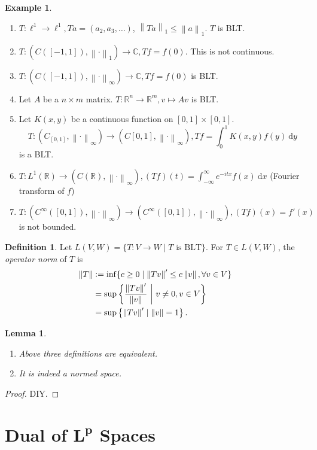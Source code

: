\documentclass{report}
\newcommand{\R}{\mathbb{R}}
\newcommand{\C}{\mathbb{C}}
\newcommand{\df}{\ \mathrm{d}}
\newcommand{\norm}[1]{\left\| #1 \right\|}
\newcommand{\defeq}{\vcentcolon=}
\newtheorem{lemma}[theorem]{Lemma}
\theoremstyle{definition}
\newtheorem{definition}[theorem]{Definition}
\newtheorem{example}[theorem]{Example}
\theoremstyle{remark}
\newcommand*\ttlmath[2]{\texorpdfstring{$\boldsymbol{#1}$}{#2}}
\begin{document}
\begin{example}
	\begin{enumerate}
		\item $T: \ell^1 \to \ell^1, Ta = (a_2, a_3, \ldots)$, $\norm{Ta}_1 \leq \norm{a}_1$. $T$ is BLT.
		\item $T: (C([-1, 1]), \norm{\cdot}_1) \to \C, Tf=f(0)$. This is not continuous.
		\item $T: (C([-1, 1]), \norm{\cdot}_\infty) \to \C, Tf=f(0)$ is BLT.
		\item Let $A$ be a $n \times m$ matrix. $T: \R^n \to \R^m, v \mapsto Av$ is BLT.
		\item Let $K(x, y)$ be a continuous function on $[0, 1] \times [0, 1]$. \[T: (C_[0, 1], \norm{\cdot}_\infty) \to (C[0, 1], \norm{\cdot}_\infty), Tf = \int_0^1 K(x, y)f(y) \df y\] is a BLT.
		\item $\displaystyle T: L^1(\R) \to (C(\R), \norm{\cdot}_\infty), (Tf)(t) = \int_{-\infty}^\infty e^{-itx}f(x) \df x$ (Fourier transform of $f$)
		\item $T: (C^\infty([0, 1]), \norm{\cdot}_\infty) \to (C^\infty([0, 1]), \norm{\cdot}_\infty), (Tf)(x) = f'(x)$ is not bounded.
	\end{enumerate}
\end{example}

\begin{definition}
	Let $L(V, W) = \{T: V \to W \mid T \text{ is BLT}\}$. For $T \in L(V, W)$, the \emph{operator norm} of $T$ is
	\begin{align*}
		\norm{T} & \defeq \inf\{c \geq 0 \mid \norm{Tv}' \leq c\norm{v}, \forall v \in V\} \\
		& = \sup\left\{\frac{\norm{Tv}'}{\norm{v}}\ \biggr\rvert\ v \neq 0, v \in V\right\} \\
		& = \sup\left\{\norm{Tv}' \mid \norm{v} = 1\right\}.
	\end{align*}
\end{definition}
\begin{lemma}
	\begin{enumerate}
		\item Above three definitions are equivalent.
		\item It is indeed a normed space.
	\end{enumerate}
\end{lemma}
\begin{proof}
	DIY.
\end{proof}

\section{Dual of \ttlmath{L^p}{Lp} Spaces}
\end{document}
